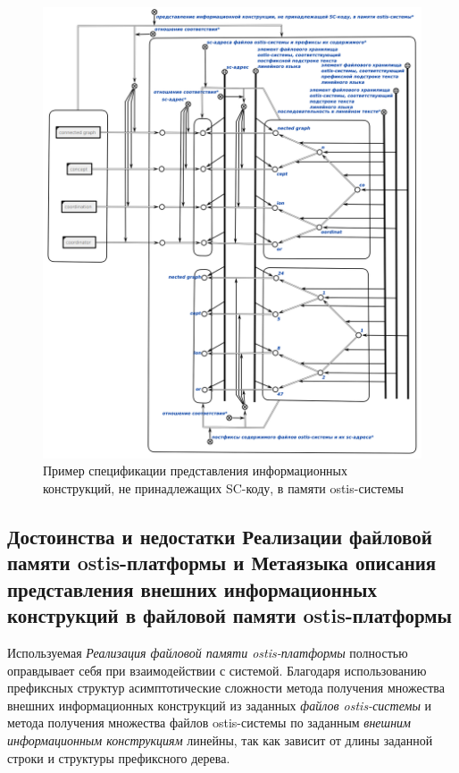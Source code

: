 \begin{figure}[htbp]
	\center
	\includegraphics[scale=0.6]{author/part6/figures/file_in_memory_representation.png}
	\caption{Пример спецификации представления информационных конструкций, не принадлежащих SC-коду, в памяти ostis-системы}
	\label{fig:file_in_memory_representation}
\end{figure}

\subsection{Достоинства и недостатки Реализации файловой памяти ostis-платформы и Метаязыка описания представления внешних информационных конструкций в файловой памяти ostis-платформы}
\label{sec_soft_platform_scfin_code_problems}

Используемая \textit{Реализация файловой памяти ostis-платформы} полностью оправдывает себя при взаимодействии с системой. Благодаря использованию префиксных структур асимптотические сложности метода получения множества внешних информационных конструкций из заданных \textit{файлов ostis-системы} и метода получения множества файлов ostis-системы по заданным \textit{внешним информационным конструкциям} линейны, так как зависит от длины заданной строки и структуры префиксного дерева.

